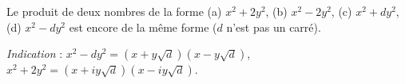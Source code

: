 Le produit de deux nombres de la forme (a) $x^2 + 2y^2$, (b) $x^2 - 2y^2$, (c) $x^2 + dy^2$, (d) $x^2 - dy^2$ est encore de la même forme ($d$ n'est pas un carré).

\emph{Indication} : $x^2 - dy^2 = (x + y\sqrt{d})(x - y\sqrt{d})$, $x^2 + 2y^2 = (x + iy\sqrt{d})(x - iy\sqrt{d})$.
